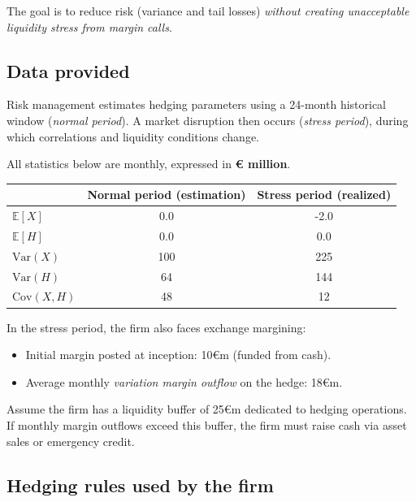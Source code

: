 \documentclass[11pt]{article}
\begin{document}
The goal is to reduce risk (variance and tail losses) \emph{without creating
unacceptable liquidity stress from margin calls}.

\subsection*{Data provided}

Risk management estimates hedging parameters using a 24-month historical window
(\emph{normal period}). A market disruption then occurs (\emph{stress period}),
during which correlations and liquidity conditions change.

All statistics below are monthly, expressed in \textbf{€ million}.

\medskip

\begin{center}
\begin{tabular}{lcc}
\hline
 & Normal period (estimation) & Stress period (realized) \\
\hline
$\mathbb{E}[X]$ & 0.0 & -2.0 \\
$\mathbb{E}[H]$ & 0.0 & 0.0 \\
$\mathrm{Var}(X)$ & 100 & 225 \\
$\mathrm{Var}(H)$ & 64 & 144 \\
$\mathrm{Cov}(X,H)$ & 48 & 12 \\
\hline
\end{tabular}
\end{center}

\medskip

In the stress period, the firm also faces exchange margining:
\begin{itemize}
  \item[$\bullet$] Initial margin posted at inception: 10€m (funded from cash).
  \item[$\bullet$] Average monthly \emph{variation margin outflow} on the hedge:
  18€m.
\end{itemize}

Assume the firm has a liquidity buffer of 25€m dedicated to hedging operations.
If monthly margin outflows exceed this buffer, the firm must raise cash via
asset sales or emergency credit.

\subsection*{Hedging rules used by the firm}
\end{document}
